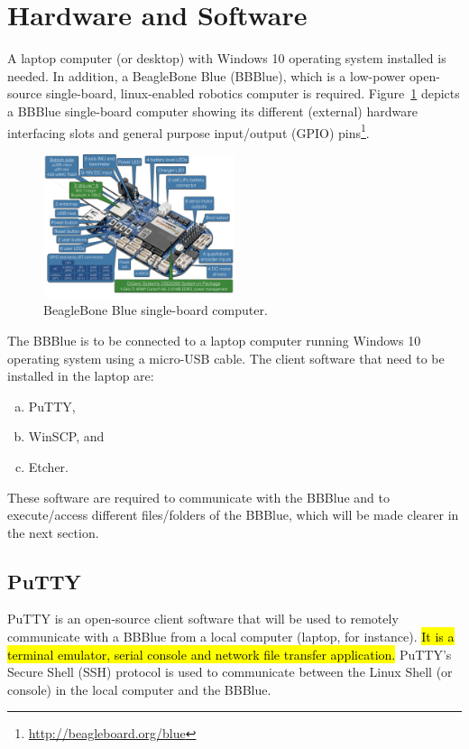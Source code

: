 \section{Hardware and Software}
A laptop computer (or desktop) with Windows 10 operating system installed is needed. In addition, a  BeagleBone Blue (BBBlue), which is a low-power open-source single-board, linux-enabled robotics computer is required. Figure~\ref{fig:BBBlue} depicts a BBBlue single-board computer showing its different  (external) hardware  interfacing slots and general purpose input/output (GPIO)  pins\footnote{\href{http://beagleboard.org/blue}{http://beagleboard.org/blue}}. %
%
\begin{figure}
    \centering
    \includegraphics[width= 0.5\textwidth]{figs/img/Lab0/BeagleBone_Blue_balloons.png}
    \caption[BeagleBone Blue single-board computer.]{BeagleBone Blue single-board computer.}
    \label{fig:BBBlue}
\end{figure}
%
The BBBlue is to  be connected to a laptop computer running Windows 10 operating system using a micro-USB cable. The client software that need to be installed in the laptop are:  
\begin{enumerate}[a)]
    \item PuTTY,
    \item WinSCP, and 
    \item Etcher.
\end{enumerate}
%
These software are required to communicate with the BBBlue and to execute/access different files/folders of the BBBlue, which will be made clearer in the next section. 

\subsection{PuTTY}
\label{sec:putty}
PuTTY is an open-source client software that will be used to remotely communicate with a BBBlue from a local computer (laptop, for instance).  \hl{It is a terminal emulator, serial console and network file transfer application.}  PuTTY's Secure Shell (SSH) protocol is used to communicate between the Linux Shell (or console) in the local computer and the BBBlue. 

